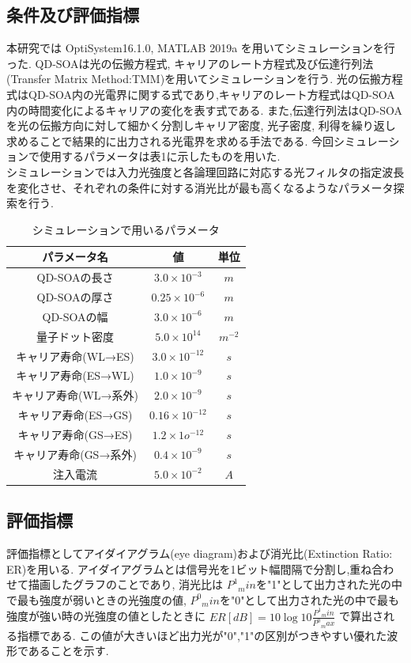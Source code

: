 \documentclass[dvipdfmx]{ujarticle}
\begin{document}
\subsection{条件及び評価指標}
本研究では OptiSystem16.1.0, MATLAB 2019a を用いてシミュレーションを行った.
QD-SOAは光の伝搬方程式, キャリアのレート方程式及び伝達行列法(Transfer Matrix Method:TMM)を用いてシミュレーションを行う.
光の伝搬方程式はQD-SOA内の光電界に関する式であり,キャリアのレート方程式はQD-SOA内の時間変化によるキャリアの変化を表す式である.
また,伝達行列法はQD-SOAを光の伝搬方向に対して細かく分割しキャリア密度, 光子密度, 利得を繰り返し求めることで結果的に出力される光電界を求める手法である.
今回シミュレーションで使用するパラメータは表1に示したものを用いた.\\
シミュレーションでは入力光強度と各論理回路に対応する光フィルタの指定波長を変化させ、それぞれの条件に対する消光比が最も高くなるようなパラメータ探索を行う.

\begin{table}[h]
  \caption{シミュレーションで用いるパラメータ}
  \centering
    \begin{tabular}{ccc}
      \hline
      パラメータ名 & 値 & 単位 \\
      \hline
      QD-SOAの長さ & $ 3.0 \times 10^{-3} $ & $m$\\
      QD-SOAの厚さ & $ 0.25 \times 10^{-6} $ & $m$\\
      QD-SOAの幅 & $ 3.0 \times 10^{-6} $ & $m$\\
      量子ドット密度 & $ 5.0 \times 10^{14} $ & $m^{-2}$\\
      キャリア寿命(WL→ES) & $ 3.0 \times 10^{-12} $ & $s$ \\
      キャリア寿命(ES→WL) & $ 1.0 \times 10^{-9} $ & $s$\\
      キャリア寿命(WL→系外) & $ 2.0 \times 10^{-9} $ & $s$\\
      キャリア寿命(ES→GS) & $ 0.16 \times 10^{-12} $ & $s$\\
      キャリア寿命(GS→ES) & $ 1.2 \times 1o^{-12} $ & $s$\\
      キャリア寿命(GS→系外) & $ 0.4 \times 10^{-9} $ & $s$\\
      注入電流 & $5.0 \times 10^{-2}  $ & $A$\\
      \hline

    \end{tabular}
\end{table}

\subsection{評価指標}
評価指標としてアイダイアグラム(eye diagram)および消光比(Extinction Ratio: ER)を用いる.
アイダイアグラムとは信号光を1ビット幅間隔で分割し,重ね合わせて描画したグラフのことであり,
消光比は ${P^1}_min$を"1"として出力された光の中で最も強度が弱いときの光強度の値,
${P^0}_min$を"0"として出力された光の中で最も強度が強い時の光強度の値としたときに
$ER[dB] = 10 \log{10}{\frac{{P^1}_min}{{P^0}_max}}$ で算出される指標である.
この値が大きいほど出力光が"0","1"の区別がつきやすい優れた波形であることを示す.
\end{document}
